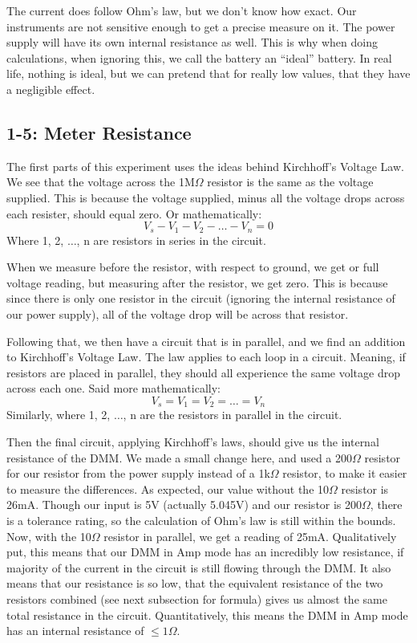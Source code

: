 \documentclass[%
 aip,
 jmp,
 amsmath,
 amssymb,
 reprint,%
 numerical,
 longbibliography,
]{revtex4-1}
\begin{document}
	The current does follow Ohm's law, but we don't know how exact. Our instruments are not
	sensitive enough to get a precise measure on it. The power supply will have its own
	internal resistance as well. This is why when doing calculations, when ignoring this,
	we call the battery an "`ideal"' battery. In real life, nothing is ideal, but we can
	pretend that for really low values, that they have a negligible effect.	
	
	\subsection{1-5: Meter Resistance}
	
	The first parts of this experiment uses the ideas behind Kirchhoff's Voltage Law.
	We see that the voltage across the 1M$\Omega$ resistor is the same as the voltage
	supplied. This is because the voltage supplied, minus all the voltage drops across
	each resister, should equal zero. Or mathematically:
	\[ V_s-V_1-V_2-\dots-V_n=0 \]
	Where 1, 2, $\dots$, n are resistors in series in the circuit.
	
	When we measure before the resistor, with respect to ground, we get or full voltage
	reading, but measuring after the resistor, we get zero. This is because since there
	is only one resistor in the circuit (ignoring the internal resistance of our power
	supply), all of the voltage drop will be across that resistor.
	
	Following that, we then have a circuit that is in parallel, and we find an addition
	to Kirchhoff's Voltage Law. The law applies to each loop in a circuit. Meaning, if
	resistors are placed in parallel, they should all experience the same voltage drop
	across each one. Said more mathematically:
	\[ V_s = V_1 = V_2 = \dots = V_n \]
	Similarly, where 1, 2, $\dots$, n are the resistors in parallel in the circuit.
	
	Then the final circuit, applying Kirchhoff's laws, should give us the internal
	resistance of the DMM. We made a small change here, and used a 200$\Omega$ resistor
	for our resistor from the power supply instead of a 1k$\Omega$ resistor, to make
	it easier to measure the differences. As expected, our value without the 10$\Omega$
	resistor is 26mA. Though our input is 5V (actually 5.045V) and our resistor is 
	200$\Omega$, there is a tolerance rating, so the calculation of Ohm's law is still
	within the bounds. Now, with the 10$\Omega$ resistor in parallel, we get a reading 
	of 25mA. Qualitatively put, this means that our DMM in Amp mode has an incredibly
	low resistance, if majority of the current in the circuit is still flowing through
	the DMM. It also means that our resistance is so low, that the equivalent resistance
	of the two resistors combined (see next subsection for formula) gives us almost the same
	total resistance in the circuit. Quantitatively, this means the DMM in Amp mode has
	an internal resistance of $\leq 1\Omega$.
	
\end{document}
